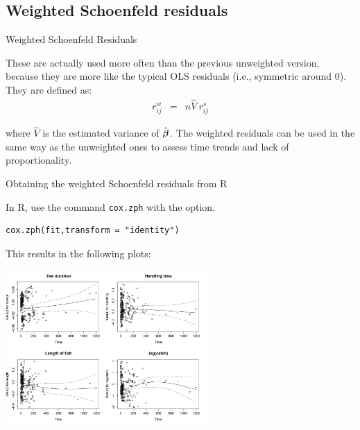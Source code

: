 \documentclass[envcountsect, 10pt, portrait, palatino]{beamer}
\newcommand{\bfbeta}{{\mbox{\boldmath$\beta$}}}
\begin{document}
\subsection{Weighted Schoenfeld residuals}
\begin{frame}{Weighted Schoenfeld Residuals}

These are actually used more often than the previous unweighted
version, because they are more like the typical OLS residuals (i.e.,
symmetric around 0).
\\[2ex]
They are defined as:
\begin{eqnarray*}
r_{ij}^w & = & n \widehat{V}~ r_{ij}^s
\end{eqnarray*}

where $\widehat{V}$ is the estimated variance of $\hat{\bfbeta}$.  The weighted
residuals can be used in the same way as the unweighted ones to assess
time trends and lack of proportionality.
\end{frame}
\begin{frame}[fragile]{Obtaining the weighted Schoenfeld residuals from R}

In R, use the command {\tt cox.zph} with the option.
\scriptsize
\begin{verbatim}
cox.zph(fit,transform = "identity")
\end{verbatim}
\normalsize
This results in the following plots:
\centerline{\includegraphics[width=3in]{wgt_sch_res.pdf}}
\end{frame}
\end{document}
